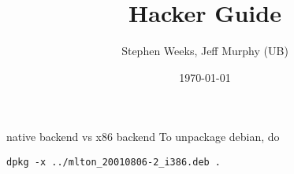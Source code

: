 \documentclass[12pt,openany]{report}
\title{{\mlton} Hacker Guide}
\author{Stephen Weeks, Jeff Murphy (UB)}
\date{\today}
\begin{document}
\maketitle

\tableofcontents





native backend vs x86 backend
To unpackage debian, do
\begin{verbatim}
dpkg -x ../mlton_20010806-2_i386.deb .
\end{verbatim}
\printindex


\end{document}
